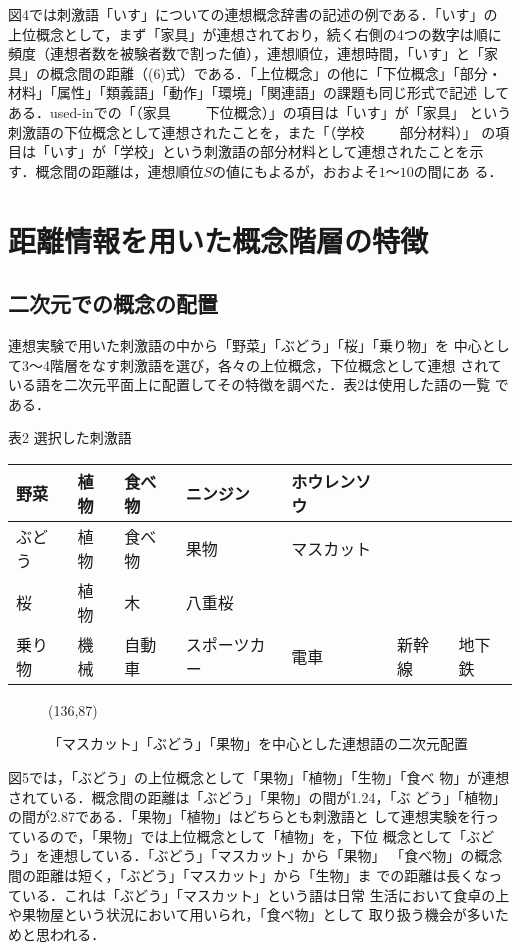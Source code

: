 図4では刺激語「いす」についての連想概念辞書の記述の例である．「いす」の
上位概念として，まず「家具」が連想されており，続く右側の4つの数字は順に
頻度（連想者数を被験者数で割った値），連想順位，連想時間，「いす」と「家
具」の概念間の距離（(6)式）である．「上位概念」の他に「下位概念」「部分・
材料」「属性」「類義語」「動作」「環境」「関連語」の課題も同じ形式で記述
してある．used-inでの「（家具~~~~~下位概念）」の項目は「いす」が「家具」
という刺激語の下位概念として連想されたことを，また「（学校~~~~~部分材料）」
の項目は「いす」が「学校」という刺激語の部分材料として連想されたことを示
す．概念間の距離は，連想順位$S$の値にもよるが，おおよそ$1$〜$10$の間にあ
る．

\section{距離情報を用いた概念階層の特徴}

\subsection{二次元での概念の配置}

連想実験で用いた刺激語の中から「野菜」「ぶどう」「桜」「乗り物」を
中心として3〜4階層をなす刺激語を選び，各々の上位概念，下位概念として連想
されている語を二次元平面上に配置してその特徴を調べた．表2は使用した語の一覧
である．

\begin{center}
表2 選択した刺激語
\vspace*{1ex}

\begin{tabular}{|l|llllll|} \hline
野菜&植物&食べ物&ニンジン&ホウレンソウ&&\\ \hline
ぶどう&植物&食べ物&果物&マスカット&&\\ \hline
桜&植物&木&八重桜&&&\\ \hline
乗り物&機械&自動車&スポーツカー&電車&新幹線&地下鉄\\ \hline
\end{tabular}
\end{center}

\begin{figure}[htb]
\begin{center}
\atari(136,87)
\vspace*{1em}
\caption{「マスカット」「ぶどう」「果物」を中心とした連想語の二次元配置}
\end{center}
\end{figure}

図5では，「ぶどう」の上位概念として「果物」「植物」「生物」「食べ
物」が連想されている．概念間の距離は「ぶどう」「果物」の間が1.24，「ぶ
どう」「植物」の間が2.87である．「果物」「植物」はどちらとも刺激語と
して連想実験を行っているので，「果物」では上位概念として「植物」を，下位
概念として「ぶどう」を連想している．「ぶどう」「マスカット」から「果物」
「食べ物」の概念間の距離は短く，「ぶどう」「マスカット」から「生物」ま
での距離は長くなっている．これは「ぶどう」「マスカット」という語は日常
生活において食卓の上や果物屋という状況において用いられ，「食べ物」として
取り扱う機会が多いためと思われる．

